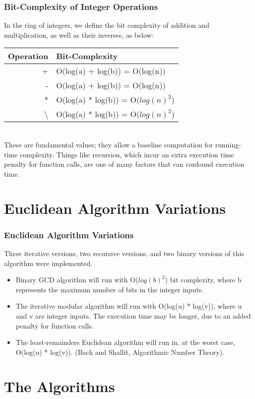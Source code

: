 \documentclass[8pt]{beamer}
\begin{document}
\begin{frame}
\frametitle{Bit-Complexity of Integer Operations}
\indent In the ring of integers, we define the bit complexity of addition and multiplication, as well as their inverses, as below: \\ 
\begin{tabular}{|r|l|}
\hline
Operation & Bit-Complexity \\  \hline
+ & O(log(a) + log(b)) = O(log(n)) \\  \hline
- & O(log(a) + log(b)) = O(log(n)) \\ \hline
* & O(log(a) * log(b)) = O($log(n)^2$) \\ \hline
\textbackslash & O(log(a) * log(b)) = O($log(n)^2$) \\ \hline

\end{tabular} \\
\indent These are fundamental values; they allow a baseline computation for running-time complexity. Things like recursion, which incur an extra execution time penalty for function calls, are one of many factors that can confound execution time. \\
\end{frame}
\section{Euclidean Algorithm Variations}
\begin{frame}
\frametitle{Euclidean Algorithm Variations}
\indent Three iterative versions, two recursive versions, and two binary versions of this algorithm were implemented. 
\begin{itemize}
\item Binary GCD algorithm will run with O($log(b)^2$) bit complexity, where b represents the maximum number of bits in the integer inputs.
\item The iterative modular algorithm will run with O(log(u) * log(v)), where u and v are integer inputs. The execution time may be longer, due to an added penalty for function calls.
\item The least-remainders Euclidean algorithm will run in, at the worst case, O(log(u) * log(v)). (Bach and Shallit, Algorithmic Number Theory).
\end{itemize}
\end{frame}
\section{The Algorithms}
\end{document}
